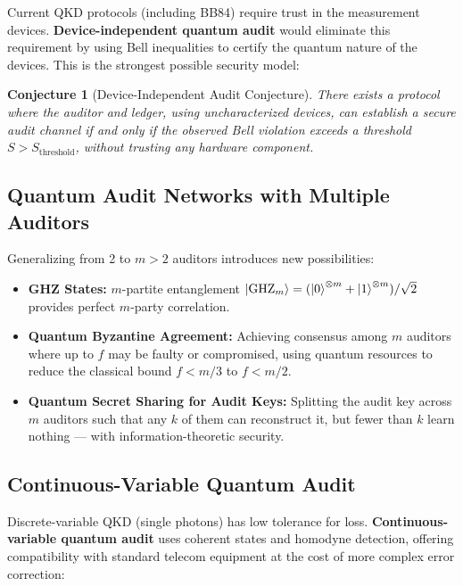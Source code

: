 \documentclass[11pt,a4paper]{article}
\theoremstyle{plain}
\newtheorem{conjecture}[theorem]{Conjecture}
\theoremstyle{definition}
\theoremstyle{remark}
\begin{document}
Current QKD protocols (including BB84) require trust in the measurement
devices. \textbf{Device-independent quantum audit} would eliminate this
requirement by using Bell inequalities to certify the quantum nature of
the devices. This is the strongest possible security model:

\begin{conjecture}[Device-Independent Audit Conjecture]
There exists a protocol where the auditor and ledger, using uncharacterized
devices, can establish a secure audit channel if and only if the observed
Bell violation exceeds a threshold $S > S_{\text{threshold}}$, without
trusting any hardware component.
\end{conjecture}

\subsection{Quantum Audit Networks with Multiple Auditors}
\label{sec:multi_auditor}

Generalizing from 2 to $m > 2$ auditors introduces new possibilities:

\begin{itemize}
  \item \textbf{GHZ States:} $m$-partite entanglement
        $\ket{\text{GHZ}_m} = (\ket{0}^{\otimes m} + \ket{1}^{\otimes m})/\sqrt{2}$
        provides perfect $m$-party correlation.
  \item \textbf{Quantum Byzantine Agreement:} Achieving consensus among
        $m$ auditors where up to $f$ may be faulty or compromised, using
        quantum resources to reduce the classical bound $f < m/3$ to
        $f < m/2$.
  \item \textbf{Quantum Secret Sharing for Audit Keys:} Splitting the
        audit key across $m$ auditors such that any $k$ of them can
        reconstruct it, but fewer than $k$ learn nothing — with
        information-theoretic security.
\end{itemize}

\subsection{Continuous-Variable Quantum Audit}
\label{sec:cv}

Discrete-variable QKD (single photons) has low tolerance for loss.
\textbf{Continuous-variable quantum audit} uses coherent states and
homodyne detection, offering compatibility with standard telecom
equipment at the cost of more complex error correction:
\end{document}

